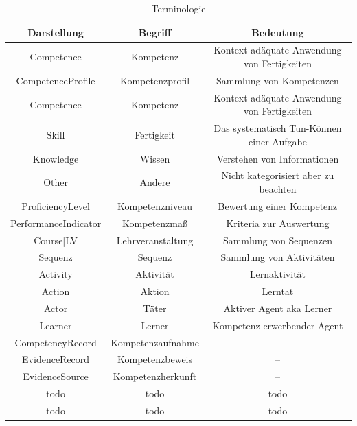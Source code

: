 \documentclass[
12pt,
english,
ngerman,
headsepline,
twoside,
openright,
numbers=noenddot,version=first
]{scrreprt}
\providecommand{\tabularnewline}{\\}
\begin{document}
\begin{table}[H]
\caption{Terminologie}


\noindent \centering{}\begin{tabular}{ccc}
\hline
\noalign{\vskip\doublerulesep}
Darstellung & Begriff & Bedeutung\tabularnewline[\doublerulesep]
\hline
\noalign{\vskip\doublerulesep}
Competence & Kompetenz & Kontext adäquate Anwendung von Fertigkeiten \tabularnewline[\doublerulesep]
\noalign{\vskip\doublerulesep}
CompetenceProfile & Kompetenzprofil & Sammlung von Kompetenzen \tabularnewline[\doublerulesep]
\noalign{\vskip\doublerulesep}
Competence & Kompetenz & Kontext adäquate Anwendung von Fertigkeiten \tabularnewline[\doublerulesep]
\noalign{\vskip\doublerulesep}
Skill & Fertigkeit & Das systematisch Tun-Können einer Aufgabe \tabularnewline[\doublerulesep]
\noalign{\vskip\doublerulesep}
Knowledge & Wissen & Verstehen von Informationen
\tabularnewline[\doublerulesep]
\noalign{\vskip\doublerulesep}
Other & Andere & Nicht kategorisiert aber zu beachten
\tabularnewline[\doublerulesep]
\noalign{\vskip\doublerulesep}
ProficiencyLevel & Kompetenzniveau & Bewertung einer Kompetenz
\tabularnewline[\doublerulesep]
\noalign{\vskip\doublerulesep}
PerformanceIndicator & Kompetenzmaß & Kriteria zur Auswertung
\tabularnewline[\doublerulesep]
\noalign{\vskip\doublerulesep}
Course|LV & Lehrveranstaltung & Sammlung von Sequenzen
\tabularnewline[\doublerulesep]
\noalign{\vskip\doublerulesep}
Sequenz & Sequenz & Sammlung von Aktivitäten
\tabularnewline[\doublerulesep]
\noalign{\vskip\doublerulesep}
Activity & Aktivität & Lernaktivität
\tabularnewline[\doublerulesep]
\noalign{\vskip\doublerulesep}
Action & Aktion & Lerntat
\tabularnewline[\doublerulesep]
\noalign{\vskip\doublerulesep}
Actor & Täter & Aktiver Agent aka Lerner
\tabularnewline[\doublerulesep]
\noalign{\vskip\doublerulesep}
Learner & Lerner & Kompetenz erwerbender Agent
\tabularnewline[\doublerulesep]
\noalign{\vskip\doublerulesep}
CompetencyRecord & Kompetenzaufnahme & --
\tabularnewline[\doublerulesep]
\noalign{\vskip\doublerulesep}
EvidenceRecord & Kompetenzbeweis & --
\tabularnewline[\doublerulesep]
\noalign{\vskip\doublerulesep}
EvidenceSource & Kompetenzherkunft & --
\tabularnewline[\doublerulesep]
\noalign{\vskip\doublerulesep}
todo & todo & todo
\tabularnewline[\doublerulesep]
\noalign{\vskip\doublerulesep}
todo & todo & todo
\tabularnewline[\doublerulesep]
\hline
\end{tabular}
\end{table}
\end{document}
